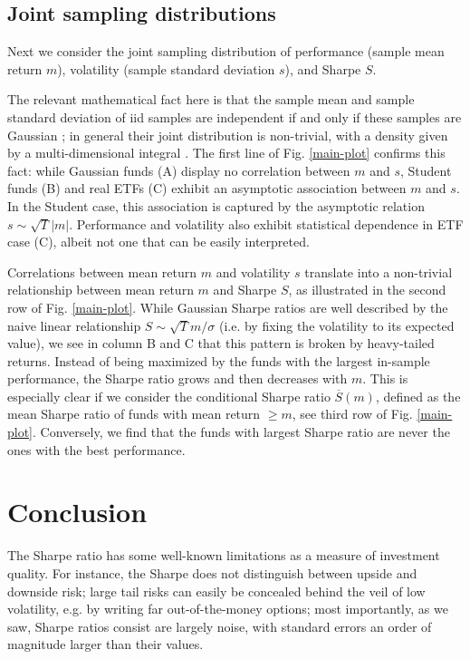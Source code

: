 \documentclass[
reprint,
amsmath,amssymb,
aps,
]{revtex4-2}
\begin{document}
\subsection{Joint sampling distributions}

Next we consider the joint sampling distribution of performance (sample mean return $m$), volatility (sample standard deviation $s$), and Sharpe $S$. 

The relevant mathematical fact here is that the sample mean and sample standard deviation of iid samples are independent if and only if these samples are Gaussian \cite{gearyDistribution1936}; in general their joint distribution is non-trivial, with a density given by a multi-dimensional integral \cite{springerJoint1953}. 
The first line of Fig. \ref{main-plot} confirms this fact: while Gaussian funds (A) display no correlation between $m$ and $s$, Student funds (B) and real ETFs (C) exhibit an asymptotic association between $m$ and $s$. 
In the Student case, this association is captured by the asymptotic relation $s \sim \sqrt{T}\vert m\vert$. 
Performance and volatility also exhibit statistical dependence in ETF case (C), albeit not one that can be easily interpreted.  

Correlations between mean return $m$ and volatility $s$ translate into a non-trivial relationship between mean return $m$ and Sharpe $S$, as illustrated in the second row of Fig. \ref{main-plot}. 
While Gaussian Sharpe ratios are well described by the naive linear relationship $S \sim \sqrt{T}m/\sigma$ (i.e. by fixing the volatility to its expected value), we see in column B and C that this pattern is broken by heavy-tailed returns.
Instead of being maximized by the funds with the largest in-sample performance, the Sharpe ratio grows and then decreases with $m$. 
This is especially clear if we consider the conditional Sharpe ratio $\overline{S}(m)$, defined as the mean Sharpe ratio of funds with mean return $\geq m$, see third row of Fig. \ref{main-plot}.
Conversely, we find that the funds with largest Sharpe ratio are never the ones with the best performance. 

\section{Conclusion}


The Sharpe ratio has some well-known limitations as a measure of investment quality. 
For instance, the Sharpe does not distinguish between upside and downside risk; large tail risks can easily be concealed behind the veil of low volatility, e.g. by writing far out-of-the-money options; most importantly, as we saw, Sharpe ratios consist are largely noise, with standard errors an order of magnitude larger than their values.
\end{document}
